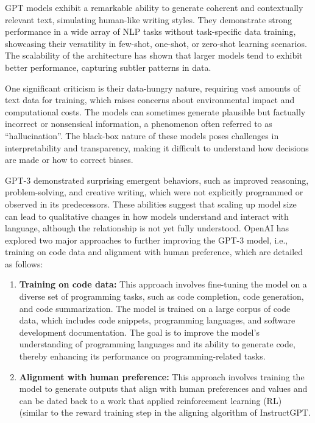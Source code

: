 GPT models exhibit a remarkable ability to generate coherent and contextually relevant text, simulating human-like writing styles.
They demonstrate strong performance in a wide array of NLP tasks without task-specific data training, showcasing their versatility in few-shot, one-shot, or zero-shot learning scenarios.
The scalability of the architecture has shown that larger models tend to exhibit better performance, capturing subtler patterns in data.

One significant criticism is their data-hungry nature, requiring vast amounts of text data for training, which raises concerns about environmental impact and computational costs.
The models can sometimes generate plausible but factually incorrect or nonsensical information, a phenomenon often referred to as \enquote{hallucination}.
The black-box nature of these models poses challenges in interpretability and transparency, making it difficult to understand how decisions are made or how to correct biases.

GPT-3 demonstrated surprising emergent behaviors, such as improved reasoning, problem-solving, and creative writing, which were not explicitly programmed or observed in its predecessors.
These abilities suggest that scaling up model size can lead to qualitative changes in how models understand and interact with language, although the relationship is not yet fully understood.
OpenAI has explored two major approaches to further improving the GPT-3 model, i.e., training on code data and alignment with human preference, which are detailed as follows:
\begin{enumerate}
    \item \textbf{Training on code data:} {
    This approach involves fine-tuning the model on a diverse set of programming tasks, such as code completion, code generation, and code summarization.
    The model is trained on a large corpus of code data, which includes code snippets, programming languages, and software development documentation.
    The goal is to improve the model's understanding of programming languages and its ability to generate code, thereby enhancing its performance on programming-related tasks.
    }
    \item \textbf{Alignment with human preference:} {
This approach involves training the model to generate outputs that align with human preferences and values and can be dated back to a work that applied reinforcement learning (RL) \cite{christiano2017deep} (similar to the reward training step in the aligning algorithm of InstructGPT.
    }
\end{enumerate}

